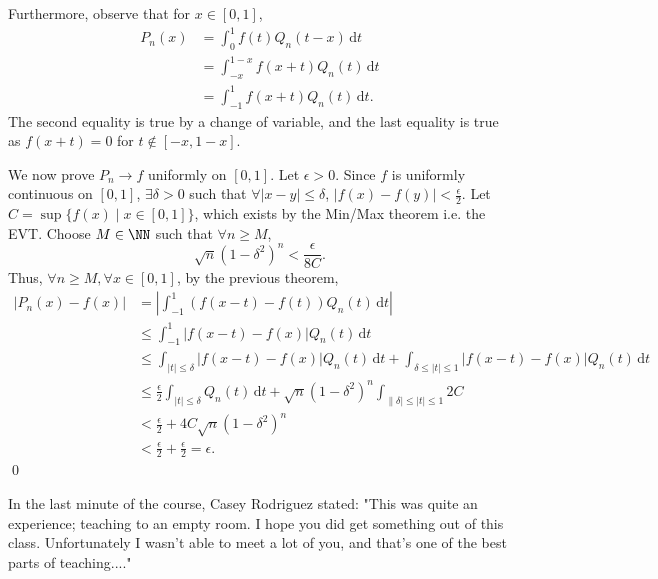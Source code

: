 Furthermore, observe that for $x\in [0,1]$,
\begin{align*}
    P_n(x) &= \int_0^1 f(t) Q_n(t-x)\,\mathrm dt \\
    &= \int_{-x}^{1-x} f(x+t)Q_n(t) \,\mathrm dt \\
    &= \int_{-1}^1 f(x+t)Q_n(t)\,\mathrm dt.
\end{align*}
The second equality is true by a change of variable, and the last equality is true as $f(x+t) = 0$ for $t\notin [-x,1-x]$.

We now prove $P_n\to f$ uniformly on $[0,1]$. Let $\epsilon>0$. Since $f$ is uniformly continuous on $[0,1]$, $\exists \delta>0$ such that $\forall |x-y|\leq \delta$, $|f(x)-f(y)|<\frac{\epsilon}{2}$. Let $C = \sup\{f(x) \mid x\in [0,1]\}$, which exists by the Min/Max theorem i.e. the EVT. Choose $M\in \NN$ such that $\forall n\geq M$, 
\[
\sqrt{n}(1-\delta^2)^n < \frac{\epsilon}{8C}.
\]
Thus, $\forall n\geq M,\forall x\in [0,1]$, by the previous theorem, 
\begin{align*}
    |P_n(x) - f(x)| &= \left|\int_{-1}^1 (f(x-t)-f(t))Q_n(t)\,\mathrm dt \right| \\
    &\leq \int_{-1}^1 |f(x-t)-f(x)|Q_{n}(t)\,\mathrm dt \\
    &\leq \int_{|t|\leq \delta} |f(x-t)-f(x)|Q_n(t)\,\mathrm dt + \int_{\delta \leq |t|\leq 1} |f(x-t)-f(x)|Q_n(t)\,\mathrm dt \\
    &\leq \frac{\epsilon}{2}\int_{|t|\leq \delta} Q_n(t) \,\mathrm dt + \sqrt{n}(1-\delta^2)^n \int_{\|\delta|\leq |t|\leq 1} 2C \\
    &< \frac{\epsilon}{2} + 4C\sqrt{n}(1-\delta^2)^n \\
    &< \frac{\epsilon}{2} + \frac{\epsilon}{2} = \epsilon.
\end{align*} \qed 

In the last minute of the course, Casey Rodriguez stated: "This was quite an experience; teaching to an empty room. I hope you did get something out of this class. Unfortunately I wasn't able to meet a lot of you, and that's one of the best parts of teaching...."


